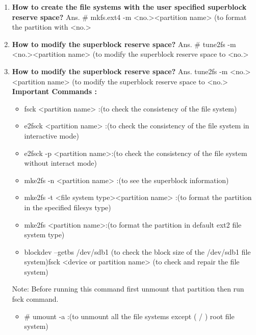 \begin{enumerate}
\begin{enumerate}
  \bigskip
  \bigskip

  \item \textbf{How to create the file systems with the user specified superblock reserve space?}
  \newline
  Ans. # mkfs.ext4   -m  <no.><partition name>	(to format the partition with <no.>%
   
  \bigskip
  \bigskip

  \item \textbf{How to modify the superblock reserve space?}
  \newline
  Ans. # tune2fs   -m  <no.><partition name>	(to modify the  superblock reserve space to  <no.>%

  \bigskip
  \bigskip

  \item \textbf{How to modify the superblock reserve space?}
  \newline
  Ans. tune2fs   -m  <no.><partition name>	(to modify the  superblock reserve space to  <no.>%
  \newline
   \textbf{Important Commands :}
     \begin{itemize}
       \item fsck   <partition name>	:(to check the consistency of the file system)
       \item e2fsck  <partition name> :(to check the consistency of the file system in interactive mode)
       \item e2fsck   -p   <partition name>:(to check the consistency of the file system without interact mode)
       \item mke2fs   -n  <partition name>	:(to see the superblock information)
       \item mke2fs   -t  <file system type><partition name> :(to format the partition in the specified filesys type)
       \item mke2fs    <partition name>:(to format the partition in default ext2 file system type)
       \item blockdev   --getbs   /dev/sdb1	(to check the block size of the /dev/sdb1 file system)fsck <device or partition name>	(to check and repair the file system) 
     \end{itemize}
     Note: Before running this command first unmount that partition then run fsck command.
    \begin{itemize}
      \item # umount   -a :(to unmount all the file systems except ( / ) root file system)

\end{itemize}
\end{enumerate}
\end{enumerate}
